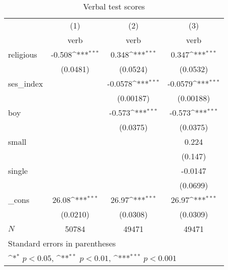 \begin{table}[htbp]\centering
\def\sym#1{\ifmmode^{#1}\else\(^{#1}\)\fi}
\caption{Verbal test scores}
\begin{tabular}{l*{3}{c}}
\hline\hline
            &\multicolumn{1}{c}{(1)}&\multicolumn{1}{c}{(2)}&\multicolumn{1}{c}{(3)}\\
            &\multicolumn{1}{c}{verb}&\multicolumn{1}{c}{verb}&\multicolumn{1}{c}{verb}\\
\hline
religious   &      -0.508\sym{***}&       0.348\sym{***}&       0.347\sym{***}\\
            &    (0.0481)         &    (0.0524)         &    (0.0532)         \\
[1em]
ses\_index   &                     &     -0.0578\sym{***}&     -0.0579\sym{***}\\
            &                     &   (0.00187)         &   (0.00188)         \\
[1em]
boy         &                     &      -0.573\sym{***}&      -0.573\sym{***}\\
            &                     &    (0.0375)         &    (0.0375)         \\
[1em]
small       &                     &                     &       0.224         \\
            &                     &                     &     (0.147)         \\
[1em]
single      &                     &                     &     -0.0147         \\
            &                     &                     &    (0.0699)         \\
[1em]
\_cons      &       26.08\sym{***}&       26.97\sym{***}&       26.97\sym{***}\\
            &    (0.0210)         &    (0.0308)         &    (0.0309)         \\
\hline
\(N\)       &       50784         &       49471         &       49471         \\
\hline\hline
\multicolumn{4}{l}{\footnotesize Standard errors in parentheses}\\
\multicolumn{4}{l}{\footnotesize \sym{*} \(p<0.05\), \sym{**} \(p<0.01\), \sym{***} \(p<0.001\)}\\
\end{tabular}
\end{table}
